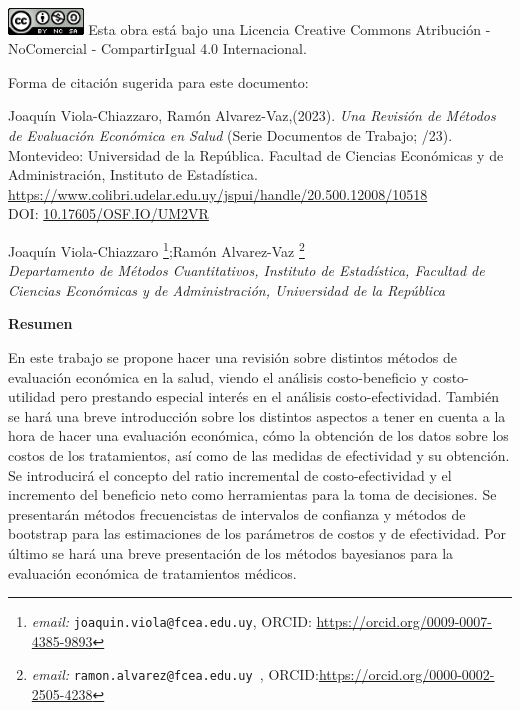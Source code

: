 \documentclass[12pt]{article}
\begin{document}
\includegraphics[width=0.15\textwidth]{grafi/licencia.png}
Esta obra est\'a bajo una Licencia Creative Commons Atribuci\'on - NoComercial - CompartirIgual 4.0 Internacional.

\pagebreak
\thispagestyle{empty} 
\vspace{15.5cm}

Forma de citación sugerida para este documento: 
\begin{flushleft}
	Joaqu\'in Viola-Chiazzaro, Ram\'on Alvarez-Vaz,(2023). \textit{Una Revisi\'on de M\'etodos de Evaluaci\'on Econ\'omica en Salud} (Serie Documentos de Trabajo; /23). Montevideo: Universidad de la Rep\'ublica. Facultad de Ciencias Econ\'omicas y de Administraci\'on, Instituto de Estad\'istica.
	\url{https://www.colibri.udelar.edu.uy/jspui/handle/20.500.12008/10518}\\
    DOI: \url{10.17605/OSF.IO/UM2VR}
\end{flushleft}

\newpage

\setcounter{page}{1} 
\thispagestyle{empty} 

\begin{center}
	\textbf{}
\end{center}


\begin{center}
	Joaqu\'in Viola-Chiazzaro \footnote{\emph{email: }\texttt{joaquin.viola@fcea.edu.uy}, ORCID: \url{https://orcid.org/0009-0007-4385-9893}\label{fn:foot_autor1}};Ram\'on Alvarez-Vaz \footnote{\emph{email: }\texttt{ramon.alvarez@fcea.edu.uy }, ORCID:\url{https://orcid.org/0000-0002-2505-4238}\label{fn:foot_autor2}}
	\\
	{\small \emph{Departamento de M\'etodos Cuantitativos, Instituto de Estad\'istica, Facultad de Ciencias Econ\'omicas y de Administraci\'on, Universidad de la Rep\'ublica}}
\end{center}
 


\begin{center}
\textbf{Resumen}

\end{center}
En este trabajo se propone hacer una revisión sobre distintos métodos de evaluación económica en la salud, viendo el análisis costo-beneficio y costo-utilidad pero prestando especial interés en el análisis costo-efectividad.
También se hará una breve introducción sobre los distintos aspectos a tener en cuenta a la hora de hacer una evaluación económica, cómo la obtención de los datos sobre los costos de los tratamientos, así como de las medidas de efectividad y su obtención.
Se introducirá el concepto del ratio incremental de costo-efectividad y el incremento del beneficio neto como herramientas para la toma de decisiones.
Se presentarán métodos frecuencistas de intervalos de confianza y métodos de bootstrap para las estimaciones de los parámetros de costos y de efectividad.
Por último se hará una breve presentación de los métodos bayesianos para la evaluación económica de tratamientos médicos.
\\
\end{document}

